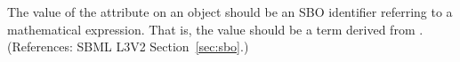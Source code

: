 The value of the attribute  on an \InitialAssignment object
should be an SBO identifier referring to a mathematical expression.  That
is, the value should be a term derived from \sbomathformula.  (References:
SBML L3V2 Section~\ref{sec:sbo}.)
